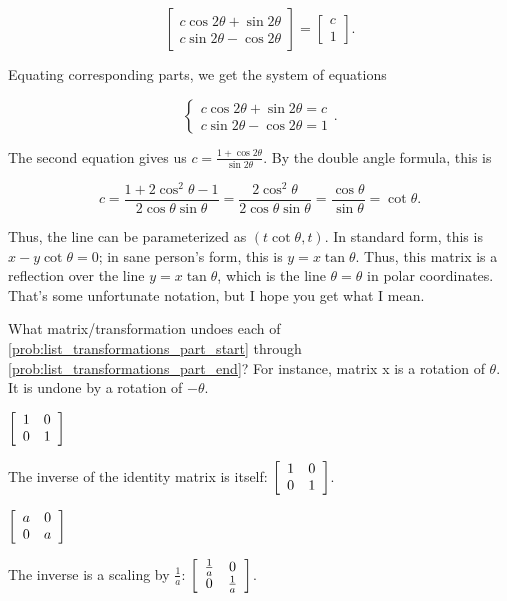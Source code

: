 \documentclass[../key.tex]{subfiles}
\begin{document}
$$\begin{bmatrix} c\cos 2\theta + \sin 2\theta \\ c\sin 2\theta - \cos 2\theta \end{bmatrix} = \begin{bmatrix} c \\ 1 \end{bmatrix}.$$

Equating corresponding parts, we get the system of equations

$$\begin{cases} c\cos 2\theta + \sin 2\theta = c \\ c\sin 2\theta - \cos 2\theta = 1 \end{cases}.$$

The second equation gives us $c = \frac{1+\cos 2\theta}{\sin 2\theta}$. By the double angle formula, this is

$$c= \frac{1+2\cos^2\theta - 1}{2\cos\theta\sin\theta} = \frac{2\cos^2\theta}{2\cos\theta\sin\theta} = \frac{\cos\theta}{\sin\theta} = \cot\theta.$$

Thus, the line can be parameterized as $(t\cot\theta, t)$. In standard form, this is $x-y\cot\theta = 0$; in sane person's form, this is $y=x\tan\theta$. Thus, this matrix is a reflection over the line $y=x\tan\theta$, which is the line $\theta = \theta$ in polar coordinates. That's some unfortunate notation, but I hope you get what I mean.

\begin{outer_problem}
\item What matrix/transformation undoes each of \ref{prob:list_transformations_part_start} through \ref{prob:list_transformations_part_end}? For instance, matrix x is a rotation of $\theta$. It is undone by a rotation of $-\theta$.
\end{outer_problem}

\begin{inner_problem}[start=1]
\item $\left[\begin{array}{cc} 1 & 0 \\ 0 & 1 \end{array}\right]$ \label{prob:list_transformations_part_start}
\end{inner_problem}

The inverse of the identity matrix is itself: $\left[\begin{array}{cc} 1 & 0 \\ 0 & 1 \end{array}\right]$.

\begin{inner_problem}
\item $\left[\begin{array}{cc} a & 0 \\ 0 & a \end{array}\right]$
\end{inner_problem}

The inverse is a scaling by $\frac{1}{a}$: $\left[\begin{array}{cc} \frac{1}{a} & 0 \\ 0 & \frac{1}{a} \end{array}\right]$.
\end{document}

